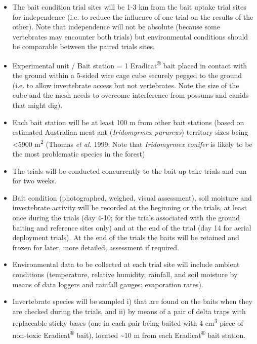 \documentclass[version=last,
    paper=a4,                               %
    10pt,                                   %
    dvipsnames,
    oneside,                              %
    headings=openany,                       %
    open=any,
    BCOR=7mm,                               %
    DIV=15,     %
]{scrbook}
\begin{document}
\begin{itemize}
\itemsep1pt\parskip0pt
\item
  The bait condition trial sites will be 1-3 km from the bait uptake
  trial sites for independence (i.e. to reduce the influence of one
  trial on the results of the other). Note that independence will not be
  absolute (because some vertebrates may encounter both trials) but
  environmental conditions should be comparable between the paired
  trials sites.
\item
  Experimental unit / Bait station = 1 Eradicat\textsuperscript{®} bait
  placed in contact with the ground within a 5-sided wire cage cube
  securely pegged to the ground (i.e. to allow invertebrate access but
  not vertebrates. Note the size of the cube and the mesh needs to
  overcome interference from possums and canids that might dig).
\item
  Each bait station will be at least 100 m from other bait stations
  (based on estimated Australian meat ant (\emph{Iridomyrmex purureus})
  territory sizes being \textless{}5900 m\textsuperscript{2} (Thomas
  \emph{et al.} 1999; Note that \emph{Iridomyrmex conifer} is likely to
  be the most problematic species in the forest)
\item
  The trials will be conducted concurrently to the bait up-take trials
  and run for two weeks.
\item
  Bait condition (photographed, weighed, visual assessment), soil
  moisture and invertebrate activity will be recorded at the beginning
  or the trials, at least once during the trials (day 4-10; for the
  trials associated with the ground baiting and reference sites only)
  and at the end of the trial (day 14 for aerial deployment trials). At
  the end of the trials the baits will be retained and frozen for later,
  more detailed, assessment if required.
\item
  Environmental data to be collected at each trial site will include
  ambient conditions (temperature, relative humidity, rainfall, and soil
  moisture by means of data loggers and rainfall gauges; evaporation
  rates).
\item
  Invertebrate species will be sampled i) that are found on the baits
  when they are checked during the trials, and ii) by means of a pair of
  delta traps with replaceable sticky bases (one in each pair being
  baited with 4 cm\textsuperscript{3} piece of non-toxic
  Eradicat\textsuperscript{®} bait), located \textasciitilde{}10 m from
  each Eradicat\textsuperscript{®} bait station.
\end{itemize}
\end{document}
